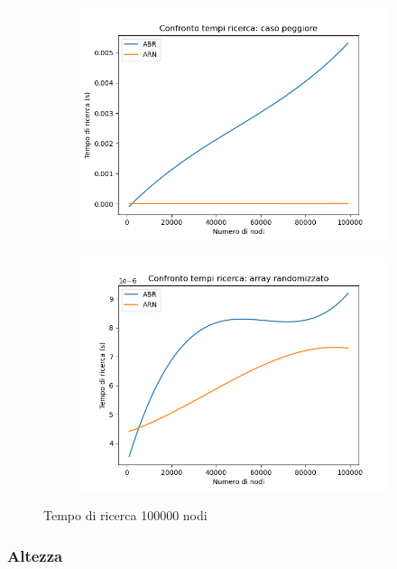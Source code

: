 \documentclass[
]{article}
\begin{document}
\begin{figure}[h!]
	\centering
	\begin{subfigure}[b]{0.4\linewidth}
		\includegraphics[width=\linewidth]{../../img/w_case/s_100000.png}
	\end{subfigure}
	\begin{subfigure}[b]{0.4\linewidth}
		\includegraphics[width=\linewidth]{../../img/rand/s_100000.png}
	\end{subfigure}
	\caption{Tempo di ricerca 100000 nodi}
	\label{fig:4}
\end{figure}

\hypertarget{altezza}{%
\subsubsection{Altezza}\label{altezza}}
\end{document}
